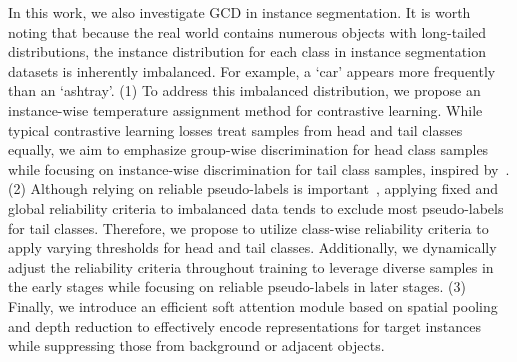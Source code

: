 


In this work, we also investigate GCD in instance segmentation. It is worth noting that because the real world contains numerous objects with long-tailed distributions, the instance distribution for each class in instance segmentation datasets is inherently imbalanced. For example, a `car' appears more frequently than an `ashtray'. (1) To address this imbalanced distribution, we propose an instance-wise temperature assignment method for contrastive learning. While typical contrastive learning losses treat samples from head and tail classes equally, we aim to emphasize group-wise discrimination for head class samples while focusing on instance-wise discrimination for tail class samples, inspired by~\cite{kukleva2023temperature}. (2) Although relying on reliable pseudo-labels is important~\cite{yang2022st++}, applying fixed and global reliability criteria to imbalanced data tends to exclude most pseudo-labels for tail classes. Therefore, we propose to utilize class-wise reliability criteria to apply varying thresholds for head and tail classes. Additionally, we dynamically adjust the reliability criteria throughout training to leverage diverse samples in the early stages while focusing on reliable pseudo-labels in later stages. (3) Finally, we introduce an efficient soft attention module based on spatial pooling and depth reduction to effectively encode representations for target instances while suppressing those from background or adjacent objects.


